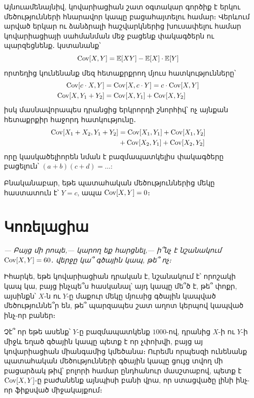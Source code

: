 Այնուամենայնիվ, կովարիացիան շատ օգտակար գործիք է երկու մեծությունների հնարավոր կապը բացահայտելու համար։ Վերևում արված երկար ու ձանձրալի հաշվարկներից խուսափելու համար կովարիացիայի սահմանման մեջ բացենք փակագծերն ու պարզեցնենք․ կստանանք՝
\[
\operatorname{Cov}[X, Y] = \mathbb{E}[XY] - \mathbb{E}[X] \cdot \mathbb{E}[Y]
\]
որտեղից կունենանք մեզ հետաքրքրող մյուս հատկությունները՝
\begin{align*}
\operatorname{Cov}[c \cdot X, Y] &= \operatorname{Cov}[X, c \cdot Y] = c \cdot \operatorname{Cov}[X, Y] \\
\operatorname{Cov}[X, Y_1 + Y_2] &= \operatorname{Cov}[X, Y_1] + \operatorname{Cov}[X, Y_2]
\end{align*}
իսկ մասնավորապես դրանցից երկրորդի շնորհիվ՝ ոչ այնքան հետաքրքիր հաջորդ հատկությունը․
\begin{align*}
\operatorname{Cov}[X_1 + X_2, Y_1 + Y_2]&= \operatorname{Cov}[X_1, Y_1] + \operatorname{Cov}[X_1, Y_2] \\&+ \operatorname{Cov}[X_2, Y_1] + \operatorname{Cov}[X_2, Y_2]
\end{align*}
որը կասկածելիորեն նման է բազմապատկելիս փակագծերը բացելուն՝ $(a+b)(c+d) = \dots$: 


Բնականաբար, եթե պատահական մեծություններից մեկը  հաստատուն է՝ $Y=c$, ապա $\operatorname{Cov}[X, Y] = 0$։


\section{Կոռելացիա}

\textit{— Բայց մի րոպե,— կարող եք հարցնել,— ի՞նչ է նշանակում $\operatorname{Cov}[X, Y] = 60$․ վերջը կա՞ գծային կապ, թե՞ ոչ։}

Իհարկե, եթե կովարիացիան դրական է, նշանակում է՝ որոշակի կապ կա, բայց ինչպե՞ս հասկանալ՝ այդ կապը մե՞ծ է, թե՞ փոքր, այսինքն՝ $X$-ն ու $Y$-ը մաքուր մեկը մյուսից գծային կապված մեծություննե՞ր են, թե՞ պարզապես շատ աղոտ կերպով կապված ինչ-որ բաներ։ 


Չէ՞ որ եթե ասենք՝ $Y$-ը բազմապատկենք $1000$-ով, դրանից $X$-ի ու $Y$-ի միջև եղած գծային կապը պետք է որ չփոխվի, բայց այ կովարիացիան միանգամից կմեծանա։ Ուրեմն որպեսզի ունենանք պատահական մեծությունների գծային կապը ցույց տվող մի բացարձակ թիվ՝ բոլորի համար ընդհանուր մասշտաբով, պետք է $\operatorname{Cov}[X, Y]$-ը բաժանենք այնպիսի բանի վրա, որ ստացվածը լինի ինչ-որ ֆիքսված միջակայքում։

